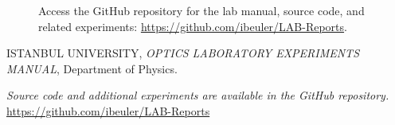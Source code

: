 \documentclass[journal]{IEEEtran}
\begin{document}
\begin{figure}[H]
    \centering
    \begin{minipage}{0.15\textwidth}
        \centering
    \end{minipage}%
    \begin{minipage}{0.2\textwidth}
        \raggedright
        \caption{Access the GitHub repository for the lab manual, source code, and related experiments: \href{https://github.com/ibeuler/LAB-Reports}{\url{https://github.com/ibeuler/LAB-Reports}}.}
        \label{fig:qr_code}
    \end{minipage}
\end{figure}

\begin{thebibliography}{9}
    ISTANBUL UNIVERSITY, \textit{OPTICS LABORATORY
    EXPERIMENTS MANUAL}, Department of Physics.

    \textit{Source code and additional experiments are available in the GitHub repository.} \url{https://github.com/ibeuler/LAB-Reports}
\end{thebibliography}
\end{document}
